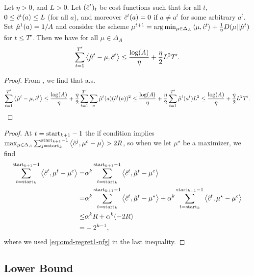 \begin{lemma} \label{lem:bandit-omd-bounded-nfg}
    Let $\eta >0$, and $L>0$. Let $(\hat{c}^t)_t$ be cost functions such that for all $t$, $0\leq\hat{c}^t(a)\leq L$ (for all $a$), and moreover $\hat{c}^t(a) = 0$ if $a\neq a^t$ for some arbitrary $a^t$. Set $\hat{\mu}^1(a) = 1/A$ and consider the scheme $\mu^{t+1} = \arg\min_{\mu \in \Delta_A} \left\langle \mu, \hat{c}^t \right\rangle + \frac{1}{\eta} D(\mu || \hat{\mu}^t)$ for $t\leq T'$. Then we have for all $\mu\in\Delta_A$
    \begin{align*}
        \sum_{t=1}^{T'} \left\langle \hat{\mu}^t-\mu, \hat{c}^t \right\rangle \leq \frac{\log(A)}{\eta} + \frac{\eta}{2} L^2 T'.
    \end{align*}
\end{lemma}

\begin{proof}
    From \citet[Sec. 10.1]{orabona2019modern}, we find that a.s.
    \begin{align*}
        \sum_{t=1}^{T'} \left\langle \hat{\mu}^t-\mu, \hat{c}^t \right\rangle \leq \frac{\log(A)}{\eta} + \frac{\eta}{2} \sum_{t=1}^{T'} \sum_a \hat{\mu}^t(a) (\hat{c}^t(a))^2
        \leq \frac{\log(A)}{\eta} + \frac{\eta}{2} \sum_{t=1}^{T'} \hat{\mu}^t(a^t) L^2 \leq \frac{\log(A)}{\eta} + \frac{\eta}{2}L^2T'.
    \end{align*}
\end{proof}

\lemmaExitNfg*

\begin{proof}
    At $t=\text{start}_{k+1}-1$ the if condition implies $\max_{\mu\in\Delta_A}\sum_{j = \text{start}_{k}}^{\text{start}_{k+1}-1} \left\langle \hat{c}^j, \mu^c - \mu \right\rangle > 2 R$, so when we let $\mu^{\star}$ be a maximizer, we find
    \begin{align*}
        \sum_{t=\text{start}_{k}}^{\text{start}_{k+1}-1} \left\langle \hat{c}^t, \mu^t-\mu^c \right\rangle =& \alpha^k \sum_{t=\text{start}_{k}}^{\text{start}_{k+1}-1} \left\langle \hat{c}^t, \hat{\mu}^t-\mu^c \right\rangle \nonumber\\
        =& \alpha^k \sum_{t=\text{start}_{k}}^{\text{start}_{k+1}-1} \left\langle \hat{c}^t, \hat{\mu}^t-\mu^{\star} \right\rangle +\alpha^k \sum_{t=\text{start}_{k}}^{\text{start}_{k+1}-1} \left\langle \hat{c}^t, \mu^{\star}-\mu^c \right\rangle \nonumber\\
        \leq& \alpha^k R + \alpha^k(-2R)\nonumber\\
        =& -2^{k-1},
    \end{align*}
    where we used \cref{eq:omd-regret1-nfg} in the last inequality.
\end{proof}

\subsection{Lower Bound} \label{app:nfg-lower}

